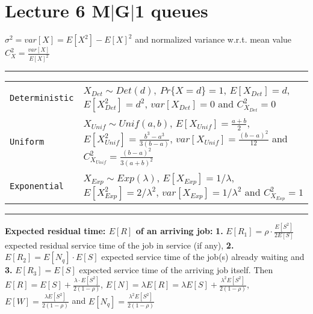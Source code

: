 \section{Lecture 6 M$|$G$|$1 queues}
$\sigma^{2} = var[X] = E[X^{2}] - E[X]^{2}$ and normalized variance w.r.t. mean value$C_{X}^{2} = \frac{var[X]}{E[X]^{2}}$

\hrule
{}
\begin{tabular}{@{}p{\the\MyLen}@{}p{\linewidth-\the\MyLen}@{}}
\verb!Deterministic!	& $X_{Det} \sim Det(d),\ Pr\{X=d\} = 1$, $E[X_{Det}] = d$, $E[X_{Det}^{2}] = d^{2}$, $var[X_{Det}] = 0$ and $C_{X_{Det}}^{2} = 0$\\
\verb!Uniform!	& $X_{Unif} \sim Unif(a, b)$, $E[X_{Unif}] = \frac{a+b}{2}$, $E[X_{Unif}^{2}] = \frac{b^3 - a^3}{3(b-a)}$, $var[X_{Unif}] = \frac{(b-a)^{2}}{12}$ and $C_{X_{Unif}}^{2} = \frac{(b-a)^{2}}{3(a+b)^{2}}$\\
\verb!Exponential!	& $X_{Exp} \sim Exp(\lambda)$, $E[X_{Exp}] = 1/\lambda$, $E[X_{Exp}^{2}] = 2/\lambda^{2}$, $var[X_{Exp}] = 1/\lambda^{2}$ and $C_{X_{Exp}}^{2} = 1$\\
\end{tabular}
\hrule

\textbf{Expected residual time: $E[R]$ of an arriving job:}
\textbf{1.} $E[R_{1}] = \rho \cdot \frac{E[S^{2}]}{2E[S]}$ expected residual service time of the job in service (if any), \textbf{2.} $E[R_{2}] = E[N_{q}] \cdot E[S]$ expected service time of the job(s) already waiting and \textbf{3.} $E[R_{3}] = E[S]$ expected service time of the arriving job itself. Then $E[R] = E[S] + \frac{\lambda \cdot E[S^{2}]}{2(1-\rho)}$, $E[N] = \lambda E[R] = \lambda E[S] + \frac{\lambda^{2} E[S^{2}]}{2(1-\rho)}$, $E[W] = \frac{\lambda E[S^{2}]}{2(1-\rho)}$ and $E[N_ {q}] = \frac{\lambda^{2} E[S^{2}]}{2(1-\rho)}$
